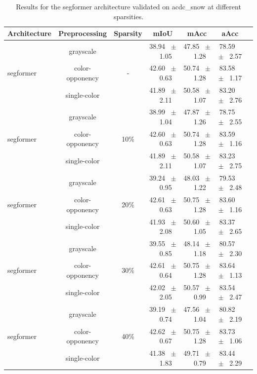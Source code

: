 \begin{table}[h]
  \centering
  \caption{Results for the segformer architecture validated on acdc_snow at different sparsities.}
  \begin{tabular}{@{}lccc ccc@{}}
    \toprule
    Architecture & Preprocessing & Sparsity & mIoU & mAcc & aAcc \\
    \midrule

    \multirow{3}{*}{segformer} & grayscale & \multirow{3}{*}{-} & 38.94 ~$\pm$~ 1.05 & 47.85 ~$\pm$~ 1.28 & 78.59 ~$\pm$~ 2.57 \\
    & color-opponency &  & 42.60 ~$\pm$~ 0.63 & 50.74 ~$\pm$~ 1.28 & 83.58 ~$\pm$~ 1.17 \\
    & single-color &  & 41.89 ~$\pm$~ 2.11 & 50.58 ~$\pm$~ 1.07 & 83.20 ~$\pm$~ 2.76 \\
    \midrule
    \multirow{3}{*}{segformer} & grayscale & \multirow{3}{*}{10\%} & 38.99 ~$\pm$~ 1.04 & 47.87 ~$\pm$~ 1.26 & 78.75 ~$\pm$~ 2.55 \\
    & color-opponency &  & 42.60 ~$\pm$~ 0.63 & 50.74 ~$\pm$~ 1.28 & 83.59 ~$\pm$~ 1.16 \\
    & single-color &  & 41.89 ~$\pm$~ 2.11 & 50.58 ~$\pm$~ 1.07 & 83.23 ~$\pm$~ 2.75 \\
    \midrule
    \multirow{3}{*}{segformer} & grayscale & \multirow{3}{*}{20\%} & 39.24 ~$\pm$~ 0.95 & 48.03 ~$\pm$~ 1.22 & 79.53 ~$\pm$~ 2.48 \\
    & color-opponency &  & 42.61 ~$\pm$~ 0.63 & 50.75 ~$\pm$~ 1.28 & 83.60 ~$\pm$~ 1.16 \\
    & single-color &  & 41.93 ~$\pm$~ 2.08 & 50.60 ~$\pm$~ 1.05 & 83.37 ~$\pm$~ 2.65 \\
    \midrule
    \multirow{3}{*}{segformer} & grayscale & \multirow{3}{*}{30\%} & 39.55 ~$\pm$~ 0.85 & 48.14 ~$\pm$~ 1.18 & 80.57 ~$\pm$~ 2.30 \\
    & color-opponency &  & 42.61 ~$\pm$~ 0.64 & 50.75 ~$\pm$~ 1.28 & 83.64 ~$\pm$~ 1.13 \\
    & single-color &  & 42.02 ~$\pm$~ 2.05 & 50.57 ~$\pm$~ 0.99 & 83.54 ~$\pm$~ 2.47 \\
    \midrule
    \multirow{3}{*}{segformer} & grayscale & \multirow{3}{*}{40\%} & 39.19 ~$\pm$~ 0.74 & 47.56 ~$\pm$~ 1.04 & 80.82 ~$\pm$~ 2.19 \\
    & color-opponency &  & 42.62 ~$\pm$~ 0.67 & 50.75 ~$\pm$~ 1.28 & 83.73 ~$\pm$~ 1.06 \\
    & single-color &  & 41.38 ~$\pm$~ 1.83 & 49.71 ~$\pm$~ 0.79 & 83.44 ~$\pm$~ 2.29 \\

\end{tabular}
\end{table}
